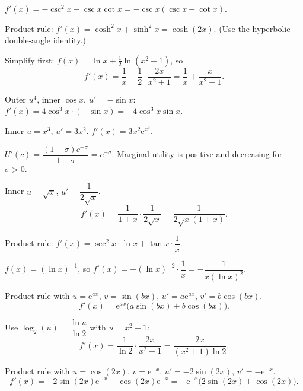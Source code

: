 \begin{solutions}
  \item $f'(x)=-\csc^{2}x-\csc x\cot x=-\csc x(\csc x+\cot x)$.

  \item Product rule: $f'(x)=\cosh^{2}x+\sinh^{2}x=\cosh(2x)$. (Use the
        hyperbolic double-angle identity.)

  \item Simplify first: $f(x)=\ln x+\tfrac12\ln(x^{2}+1)$, so
        \[
          f'(x)=\frac{1}{x}+\frac12\cdot\frac{2x}{x^{2}+1}
               =\frac{1}{x}+\frac{x}{x^{2}+1} .
        \]

  \item Outer $u^{4}$, inner $\cos x$, $u'=-\sin x$: $f'(x)=4\cos^{3}x\cdot
        (-\sin x)=-4\cos^{3}x\sin x$.

  \item Inner $u=x^{3}$, $u'=3x^{2}$. $f'(x)=3x^{2}\mathrm{e}^{x^{3}}$.

  \item $U'(c)=\dfrac{(1-\sigma)c^{-\sigma}}{1-\sigma}=c^{-\sigma}$.
        Marginal utility is positive and decreasing for $\sigma>0$.

  \item Inner $u=\sqrt{x}$, $u'=\dfrac{1}{2\sqrt{x}}$.
        \[
          f'(x)=\frac{1}{1+x}\cdot\frac{1}{2\sqrt{x}}
               =\frac{1}{2\sqrt{x}(1+x)} .
        \]

  \item Product rule: $f'(x)=\sec^{2}x\cdot\ln x+\tan x\cdot\dfrac{1}{x}$.

  \item $f(x)=(\ln x)^{-1}$, so $f'(x)=-(\ln x)^{-2}\cdot\dfrac{1}{x}
        =-\dfrac{1}{x(\ln x)^{2}}$.

  \item Product rule with $u=\mathrm{e}^{ax}$, $v=\sin(bx)$,
        $u'=a\mathrm{e}^{ax}$, $v'=b\cos(bx)$.
        \[
          f'(x)=\mathrm{e}^{ax}\bigl(a\sin(bx)+b\cos(bx)\bigr) .
        \]

  \item Use $\log_{2}(u)=\dfrac{\ln u}{\ln 2}$ with $u=x^{2}+1$:
        \[
          f'(x)=\frac{1}{\ln 2}\cdot\frac{2x}{x^{2}+1}
               =\frac{2x}{(x^{2}+1)\ln 2} .
        \]

  \item Product rule with $u=\cos(2x)$, $v=\mathrm{e}^{-x}$,
        $u'=-2\sin(2x)$, $v'=-\mathrm{e}^{-x}$.
        \[
          f'(x)=-2\sin(2x)\mathrm{e}^{-x}-\cos(2x)\mathrm{e}^{-x}
               =-\mathrm{e}^{-x}\bigl(2\sin(2x)+\cos(2x)\bigr) .
        \]


\end{solutions}
